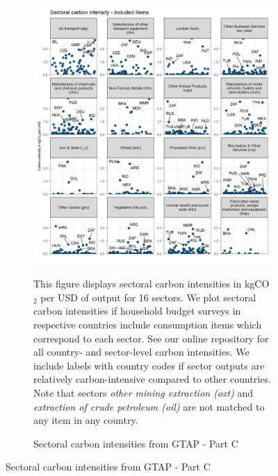 \begin{figure}[ht!]\ContinuedFloat
\begin{subfigure}[b]{\textwidth}
  \centering
  \caption{Sectoral carbon intensities from GTAP - Part C} \label{fig:B3}  \includegraphics{Analysis_Carbon_Intensities_GTAP/Figure_2.1.1_C_2017}
  \begin{subcaption2}
    This figure displays sectoral carbon intensities in kgCO$_{2}$ per USD of output for 16 sectors. We plot sectoral carbon intensities if household budget surveys in respective countries include consumption items which correspond to each sector. See our online repository for all country- and sector-level carbon intensities. We include labels with country codes if sector outputs are relatively carbon-intensive compared to other countries. Note that sectors \textit{other mining extraction (oxt)} and \textit{extraction of crude petroleum (oil)} are not matched to any item in any country.
  \end{subcaption2}
\end{subfigure}
\end{figure}

\clearpage

